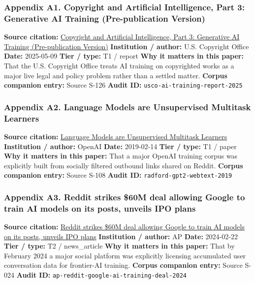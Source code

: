 \documentclass[
  american,
  11pt,
  letterpaper,
]{article}
\begin{document}
\subsubsection{Appendix A1. Copyright and Artificial Intelligence, Part
3: Generative AI Training (Pre-publication
Version)}\label{appendix-a1-copyright-and-artificial-intelligence-part-3-generative-ai-training-pre-publication-version}

\textbf{Source citation:}
\href{https://copyright.gov/ai/Copyright-and-Artificial-Intelligence-Part-3-Generative-AI-Training-Report-Pre-Publication-Version.pdf}{Copyright
and Artificial Intelligence, Part 3: Generative AI Training
(Pre-publication Version)} \textbf{Institution / author:} U.S. Copyright
Office \textbf{Date:} 2025-05-09 \textbf{Tier / type:} T1 / report
\textbf{Why it matters in this paper:} That the U.S. Copyright Office
treats AI training on copyrighted works as a major live legal and policy
problem rather than a settled matter. \textbf{Corpus companion entry:}
Source S-126 \textbf{Audit ID:} \texttt{usco-ai-training-report-2025}

\subsubsection{Appendix A2. Language Models are Unsupervised Multitask
Learners}\label{appendix-a2-language-models-are-unsupervised-multitask-learners}

\textbf{Source citation:}
\href{https://cdn.openai.com/better-language-models/language_models_are_unsupervised_multitask_learners.pdf}{Language
Models are Unsupervised Multitask Learners} \textbf{Institution /
author:} OpenAI \textbf{Date:} 2019-02-14 \textbf{Tier / type:} T1 /
paper \textbf{Why it matters in this paper:} That a major OpenAI
training corpus was explicitly built from socially filtered outbound
links shared on Reddit. \textbf{Corpus companion entry:} Source S-108
\textbf{Audit ID:} \texttt{radford-gpt2-webtext-2019}

\subsubsection{Appendix A3. Reddit strikes \$60M deal allowing Google to
train AI models on its posts, unveils IPO
plans}\label{appendix-a3-reddit-strikes-60m-deal-allowing-google-to-train-ai-models-on-its-posts-unveils-ipo-plans}

\textbf{Source citation:}
\href{https://apnews.com/article/a7f131c7cb4225307134ef21d3c6a708}{Reddit
strikes \$60M deal allowing Google to train AI models on its posts,
unveils IPO plans} \textbf{Institution / author:} AP \textbf{Date:}
2024-02-22 \textbf{Tier / type:} T2 / news\_article \textbf{Why it
matters in this paper:} That by February 2024 a major social platform
was explicitly licensing accumulated user conversation data for
frontier-AI training. \textbf{Corpus companion entry:} Source S-024
\textbf{Audit ID:} \texttt{ap-reddit-google-ai-training-deal-2024}
\end{document}
